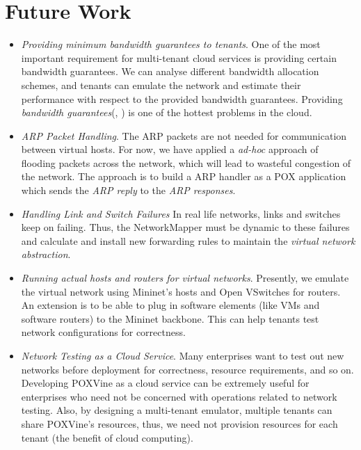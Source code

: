 \chapter{Future Work}
\begin{itemize}
	\item \emph{Providing minimum bandwidth guarantees to tenants}. One of the most important requirement for multi-tenant cloud services is providing certain bandwidth guarantees. We can analyse different bandwidth allocation schemes, and tenants can emulate the network and estimate their performance with respect to the provided bandwidth guarantees. Providing \emph{bandwidth guarantees}(\cite{secondnet}, \cite{oktopus}) is one of the hottest problems in the cloud. 
	
	\item \emph{ARP Packet Handling}. The ARP packets are not needed for communication between virtual hosts. For now, we have applied a \emph{ad-hoc} approach of flooding packets across the network, which will lead to wasteful congestion of the network. The approach is to build a ARP handler as a POX application which sends the \emph{ARP reply} to the \emph{ARP responses}. 
	
	\item \emph{Handling Link and Switch Failures} In real life networks, links and switches keep on failing. Thus, the NetworkMapper must be dynamic to these failures and calculate and install new forwarding rules to maintain the \emph{virtual network abstraction}.
	
	\item \emph{Running actual hosts and routers for virtual networks}. Presently, we emulate the virtual network using Mininet's hosts and Open VSwitches for routers. An extension is to be able to plug in software elements (like VMs and software routers)  to the Mininet backbone. This can help tenants test network configurations for correctness.  
	
	\item \emph{Network Testing as a  Cloud Service}. Many enterprises want to test out new networks before deployment for correctness, resource requirements, and so on. Developing POXVine as a cloud service can be extremely useful for enterprises who need not be concerned with operations related to network testing. Also, by designing a multi-tenant emulator, multiple tenants can share POXVine's resources, thus, we need not provision resources for each tenant (the benefit of cloud computing).
\end{itemize}

